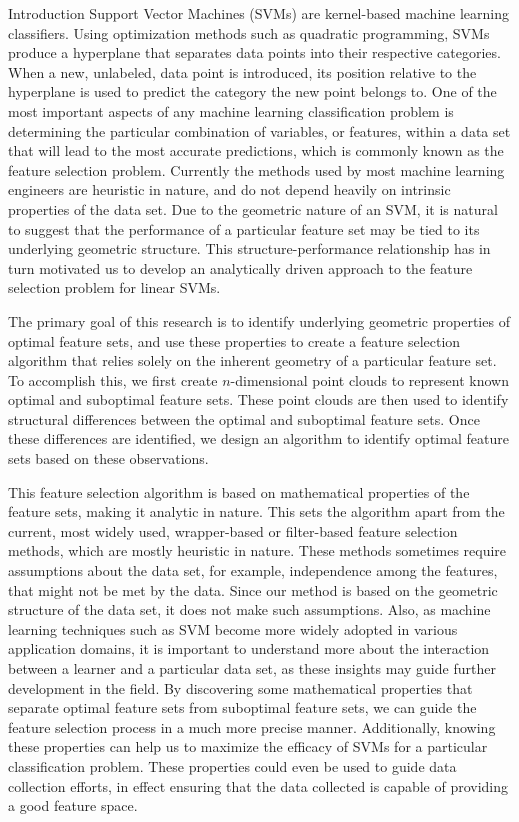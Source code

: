 \documentclass{llncs}
\begin{document}
\begin{section}{Introduction}
Support Vector Machines (SVMs) are kernel-based machine learning classifiers\cite{Vapnik}. Using optimization methods such as quadratic programming, SVMs produce a hyperplane that separates data points into their respective categories. When a new, unlabeled, data point is introduced, its position relative to the hyperplane is used to predict the category the new point belongs to. One of the most important aspects of any machine learning classification problem is determining the particular combination of variables, or features, within a data set that will lead to the most accurate predictions, which is commonly known as the feature selection problem. Currently the methods used  by most machine learning engineers are heuristic in nature, and do not depend heavily on intrinsic properties of the data set\cite{HanKamber}. Due to the geometric nature of an SVM, it is natural to suggest that the performance of a particular feature set may be tied to its underlying geometric structure. This structure-performance relationship has in turn motivated us to develop an analytically driven approach to the feature selection problem for linear SVMs.
	
	
The primary goal of this research is to identify underlying geometric properties of optimal feature sets, and use these properties to create a feature selection algorithm that relies solely on the inherent geometry of a particular feature set. To accomplish this, we first create $n$-dimensional point clouds to represent known optimal and suboptimal feature sets. These point clouds are then used to identify structural differences between the optimal and suboptimal feature sets. Once these differences are identified, we design an algorithm to identify optimal feature sets based on these observations.

This feature selection algorithm is based on mathematical properties of the feature sets, making it analytic in nature. This sets the algorithm apart from the current, most widely used, wrapper-based or filter-based feature selection methods, which are mostly heuristic in nature\cite{HanKamber}. These methods sometimes require assumptions about the data set, for example, independence among the features, that might not be met by the data. Since our method is based on the geometric structure of the data set, it does not make such assumptions. Also, as machine learning techniques such as SVM become more widely adopted in various application domains, it is important to understand more about the interaction between a learner and a particular data set, as these insights may guide further development in the field. By discovering some mathematical properties that separate optimal feature sets from suboptimal feature sets, we can guide the feature selection process in a much more precise manner. Additionally, knowing these properties can help us to maximize the efficacy of SVMs for a particular classification problem. These properties could even be used to guide data collection efforts, in effect ensuring that the data collected is capable of providing a good feature space.


\end{section}
\end{document}

